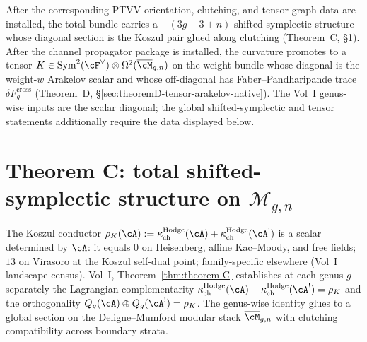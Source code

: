 After the corresponding PTVV orientation, clutching, and tensor graph
data are installed, the total bundle carries a
$-(3g{-}3{+}n)$-shifted symplectic structure whose diagonal section is
the Koszul pair glued along clutching (Theorem~C,
\S\ref{sec:theoremC-total-shifted-symplectic-native}). After the
channel propagator package is installed, the curvature promotes to a tensor
$K \in \operatorname{Sym}^2(\cF^\vee) \otimes \Omega^2(\overline{\cM}_{g,n})$
on the weight-bundle whose diagonal is the weight-$w$ Arakelov
scalar and whose off-diagonal has Faber--Pandharipande trace
$\delta F_g^{\mathrm{cross}}$ (Theorem~D,
\S\ref{sec:theoremD-tensor-arakelov-native}). The Vol~I genus-wise
inputs are the scalar diagonal; the global shifted-symplectic and
tensor statements additionally require the data displayed below.

\section{Theorem C: total shifted-symplectic structure on $\overline{\mathcal{M}}_{g,n}$}
\label{sec:theoremC-total-shifted-symplectic-native}

The Koszul conductor
$\rho_K(\cA) := \kappaChHodge(\cA) + \kappaChHodge(\cA^!)$ is a
scalar determined by $\cA$: it equals $0$ on Heisenberg, affine
Kac--Moody, and free fields; $13$ on Virasoro at the Koszul
self-dual point; family-specific elsewhere (Vol~I landscape
census). Vol~I, Theorem~\ref*{thm:theorem-C} establishes at each
genus $g$ separately the Lagrangian complementarity
$\kappaChHodge(\cA) + \kappaChHodge(\cA^!) = \rho_K$ and the
orthogonality $Q_g(\cA) \oplus Q_g(\cA^!) = \rho_K$. The
genus-wise identity glues to a global section on the
Deligne--Mumford modular stack $\overline{\cM}_{g,n}$ with
clutching compatibility across boundary strata.

